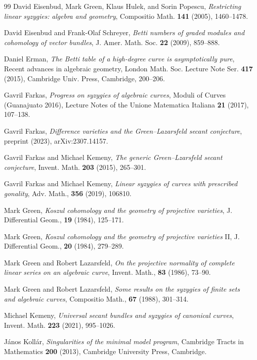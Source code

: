 \documentclass[graybox]{svmult}
\begin{document}
\begin{thebibliography}{99}
David Eisenbud, Mark Green, Klaus Hulek, and Sorin Popescu, \textit{Restricting linear syzygies: algebra and geometry}, Compositio Math. \textbf{141} (2005), 1460--1478.

David Eisenbud and Frank-Olaf Schreyer, \textit{Betti numbers of graded modules and cohomology of vector bundles}, J. Amer. Math. Soc. \textbf{22} (2009), 859--888.	
	
Daniel Erman, \textit{The Betti table of a high-degree curve is asymptotically pure},  Recent advances in algebraic geometry, London Math. Soc. Lecture Note Ser. \textbf{417} (2015), Cambridge Univ. Press, Cambridge, 200--206.

Gavril Farkas, \textit{Progress on syzygies of algebraic curves}, Moduli of Curves (Guanajuato 2016), Lecture Notes of the Unione Matematica Italiana \textbf{21} (2017), 107--138.

Gavril Farkas, \textit{Difference varieties and the Green--Lazarsfeld secant conjecture}, preprint (2023), arXiv:2307.14157.

Gavril Farkas and Michael Kemeny, \textit{The generic Green--Lzarsfeld secant conjecture}, Invent. Math. \textbf{203} (2015), 265--301.

Gavril Farkas and Michael Kemeny, \textit{Linear syzygies of curves with prescribed gonality}, Adv. Math., \textbf{356} (2019), 106810.

Mark Green, \textit{Koszul cohomology and the geometry of projective varieties}, J. Differential Geom., \textbf{19} (1984), 125--171.
	
Mark Green, \textit{Koszul cohomology and the geometry of projective varieties} II, J. Differential Geom., \textbf{20} (1984), 279--289.

Mark Green and Robert Lazarsfeld, \textit{On the projective normality of complete linear series on an algebraic curve}, Invent. Math., \textbf{83} (1986), 73--90.
	
Mark Green and Robert Lazarsfeld, \textit{Some results on the syzygies of finite sets and algebraic curves}, Compositio Math., \textbf{67} (1988), 301--314.

Michael Kemeny,  \textit{Universal secant bundles and syzygies of canonical curves}, Invent. Math. \textbf{223} (2021), 995--1026.

J\'{a}nos Koll\'{a}r, \textit{Singularities of the minimal model program}, Cambridge Tracts in Mathematics \textbf{200} (2013), Cambridge University Press, Cambridge.


\end{thebibliography}
\end{document}
